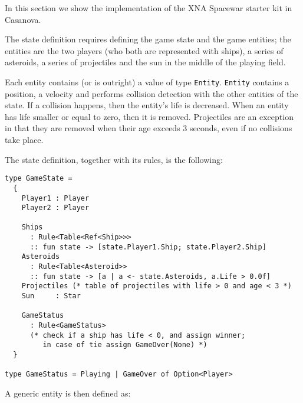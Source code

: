 
In this section we show the implementation of the XNA Spacewar starter kit in Casanova.

The state definition requires defining the game state and the game entities; the entities are the two players (who both are represented with ships), a series of asteroids, a series of projectiles and the sun in the middle of the playing field.

Each entity contains (or is outright) a value of type \texttt{Entity}. \texttt{Entity} contains a position, a velocity and performs collision detection with the other entities of the state. If a collision happens, then the entity's life is decreased. When an entity has life smaller or equal to zero, then it is removed. Projectiles are an exception in that they are removed when their age exceeds 3 seconds, even if no collisions take place.

The state definition, together with its rules, is the following:

\begin{lstlisting}
type GameState =
  {
    Player1 : Player
    Player2 : Player

    Ships 
      : Rule<Table<Ref<Ship>>>
      :: fun state -> [state.Player1.Ship; state.Player2.Ship]    
    Asteroids
      : Rule<Table<Asteroid>>
      :: fun state -> [a | a <- state.Asteroids, a.Life > 0.0f]
    Projectiles (* table of projectiles with life > 0 and age < 3 *)
    Sun     : Star

    GameStatus          
      : Rule<GameStatus>
      (* check if a ship has life < 0, and assign winner;
         in case of tie assign GameOver(None) *)
  }

type GameStatus = Playing | GameOver of Option<Player>
\end{lstlisting}

A generic entity is then defined as:

